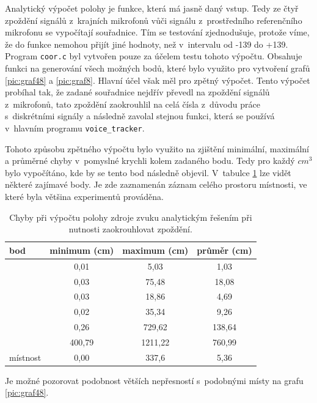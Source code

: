 Analytický výpočet polohy je funkce, která má jasně daný vstup. Tedy ze čtyř zpoždění signálů z~krajních mikrofonů vůči signálu z~prostředního referenčního mikrofonu se vypočítají souřadnice. Tím se testování zjednodušuje, protože víme, že do funkce nemohou přijít jiné hodnoty, než v~intervalu od -139 do +139. Program \texttt{coor.c} byl vytvořen pouze za účelem testu tohoto výpočtu. Obsahuje funkci na generování všech možných bodů, které bylo využito pro vytvoření grafů \ref{pic:graf48} a \ref{pic:graf8}. Hlavní účel však měl pro zpětný výpočet. Tento výpočet probíhal tak, že zadané souřadnice nejdřív převedl na zpoždění signálů z~mikrofonů, tato zpoždění zaokrouhlil na celá čísla z~důvodu práce s~diskrétními signály a následně zavolal stejnou funkci, která se používá v~hlavním programu \texttt{voice\_tracker}.

Tohoto způsobu zpětného výpočtu bylo využito na zjištění minimální, maximální a průměrné chyby v~pomyslné krychli kolem zadaného bodu. Tedy pro každý $cm^3$ bylo vypočítáno, kde by se tento bod následně objevil. V~tabulce \ref{tabulka} lze vidět některé zajímavé body. Je zde zaznamenán záznam celého prostoru místnosti, ve které byla většina experimentů prováděna.

\begin{table}[!h]
    \centering
    \begin{tabular}{||l | c | c | c||} 
 \hline
 bod & minimum (cm) & maximum (cm) & průměr (cm) \\ [0.5ex] 
 \hline\hline
 [0,0,2] & 0,01 & 5,03 & 1,03 \\ 
 \hline
 [0,0,10] & 0,03 & 75,48 & 18,08 \\
 \hline
 [2,2,2] & 0,03 & 18,86 & 4,69 \\
 \hline
 [3,1,5] & 0,02 & 35,34 & 9,26 \\
 \hline
 [5,1,1] & 0,26 & 729,62 & 138,64 \\
 \hline
 [15,15,50] & 400,79 & 1211,22 & 760,99 \\
 \hline
 místnost & 0,00 & 337,6 & 5,36 \\ [1ex] 
 \hline
    \end{tabular}
    \caption{Chyby při výpočtu polohy zdroje zvuku analytickým řešením při nutnosti zaokrouhlovat zpoždění.}
    \label{tabulka}
\end{table}


Je možné pozorovat podobnost větších nepřesností s~podobnými místy na grafu \ref{pic:graf48}.


